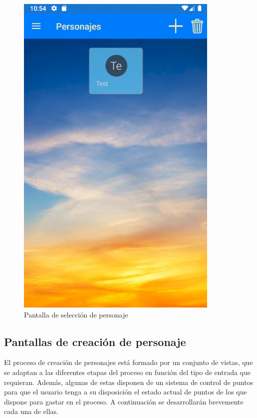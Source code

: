 \begin{figure}[H]
    \centering
    \includegraphics[scale=0.7]{Figures/Capturas/SeleccionPersonajes.png}
    \caption{Pantalla de selección de personaje}
    \label{NombrePersonajeNuevo}    
\end{figure}

\subsection{Pantallas de creación de personaje}
El proceso de creación de personajes está formado por un conjunto de vistas, que se adaptan a las diferentes etapas del 
proceso en función del tipo de entrada que requieran. Además, algunas de estas disponen de un sistema de control de puntos 
para que el usuario tenga a su disposición el estado actual de puntos de los que dispone para gastar en el proceso.
A continuación se desarrollarán brevemente cada una de ellas.

